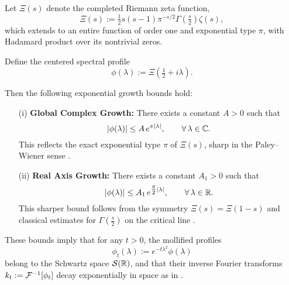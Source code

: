 \begin{lemma}
\label{lem:xi_growth_bound}
Let \( \Xi(s) \) denote the completed Riemann zeta function,
\[
\Xi(s) := \tfrac{1}{2} s(s-1) \pi^{-s/2} \Gamma\left(\tfrac{s}{2}\right) \zeta(s),
\]
which extends to an entire function of order one and exponential type \( \pi \), with Hadamard product over its nontrivial zeros.

Define the centered spectral profile
\[
\phi(\lambda) := \Xi\left( \tfrac{1}{2} + i\lambda \right).
\]

Then the following exponential growth bounds hold:
\begin{itemize}
    \item[\textup{(i)}] \textbf{Global Complex Growth:} There exists a constant \( A > 0 \) such that
    \[
    |\phi(\lambda)| \le A\, e^{\pi |\lambda|}, \qquad \forall\, \lambda \in \mathbb{C}.
    \]
    This reflects the exact exponential type \( \pi \) of \( \Xi(s) \), sharp in the Paley--Wiener sense \cite[Thm.~3.7.1]{Levin1996EntireLectures}.

    \item[\textup{(ii)}] \textbf{Real Axis Growth:} There exists a constant \( A_1 > 0 \) such that
    \[
    |\phi(\lambda)| \le A_1\, e^{\tfrac{\pi}{2} |\lambda|}, \qquad \forall\, \lambda \in \mathbb{R}.
    \]
    This sharper bound follows from the symmetry \( \Xi(s) = \Xi(1 - s) \) and classical estimates for \( \Gamma\left(\tfrac{s}{2}\right) \) on the critical line \cite[§4.12]{Titchmarsh1986Zeta}.
\end{itemize}

\medskip
\noindent
These bounds imply that for any \( t > 0 \), the mollified profiles
\[
\phi_t(\lambda) := e^{-t\lambda^2} \phi(\lambda)
\]
belong to the Schwartz space \( \mathcal{S}(\mathbb{R}) \), and that their inverse Fourier transforms \( k_t := \mathcal{F}^{-1}[\phi_t] \) decay exponentially in space as in .
\end{lemma}
